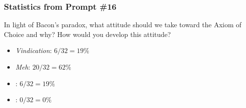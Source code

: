 \begin{frame}
\begin{itemize}[<+->]



\end{itemize}
\end{frame}

\begin{frame}
\frametitle{Statistics from Prompt \#16}

In light of Bacon's paradox, what attitude should we take toward the Axiom of Choice and why? How would you develop this attitude? 

\begin{itemize}[<+->]

\item \emph{Vindication}: $6/32 = 19 \%$

\item \emph{Meh}: $ 20/32 = 62 \%$

\item {}: $ 6/32 = 19 \%$

\item {}: $0 / 32 = 0 \%$

\end{itemize}
\end{frame}

